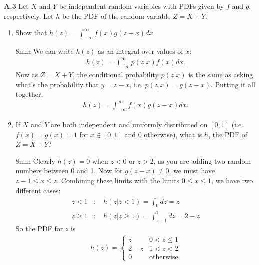 \documentclass{article}
\newenvironment{solution}{\begin{adjustwidth}{8mm}{}}{\end{adjustwidth}}
\begin{document}
\textbf{A.3}
Let $X$ and $Y$ be independent random variables with PDFs given by $f$ and $g$, respectively. 
Let $h$ be the PDF of the random variable $Z = X + Y$.

\begin{enumerate}
        \item Show that $h(z) = \int_{-\infty}^{\infty} f(x) g(z-x) dx$
        \begin{solution}
                We can write $h(z)$ as an integral over values of $x$:
                \begin{align*}
                        h(z) = \int_{-\infty}^{\infty} p(z|x) f(x) dx.
                \end{align*}
                Now as $Z = X + Y$, the conditional probability $p(z|x)$ is the same as asking what's the probability that $y = z - x$, i.e. $p(z|x) = g(z-x)$.
                Putting it all together,
                \begin{align*}
                        h(z) = \int_{-\infty}^{\infty} f(x) g(z-x) dx.
                \end{align*}
        \end{solution}
        \item If $X$ and $Y$ are both independent and uniformly distributed on $[0,1]$ (i.e. $f(x) = g(x) = 1$ for $x \in [0,1]$ and 0 otherwise), what is $h$, the PDF of $Z = X + Y$?
        \begin{solution}
                Clearly $h(z) = 0$ when $z<0$ or $z>2$, as you are adding two random numbers between 0 and 1.
                Now for $g(z-x) \neq 0$, we must have $z-1 \leq x \leq z$.
                Combining these limits with the limits $0 \leq x \leq 1$, we have two different cases:
                \begin{align*}
                        z < 1 &: \quad h(z|z<1) = \int_0^z dz = z \\
                        z \geq 1 &: \quad h(z|z \geq 1) = \int_{z-1}^1 dz = 2 - z 
                \end{align*}
        So the PDF for $z$ is 
        \begin{align*}
                h(z) = 
                \begin{cases}
                        z & 0 < z \leq 1 \\
                        2-z & 1 < z < 2 \\
                        0 &\text{otherwise}        
                \end{cases}
        \end{align*}
        \end{solution}
\end{enumerate}
\end{document}
